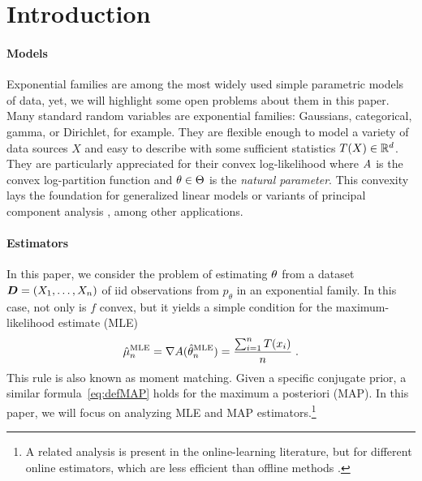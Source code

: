\section{Introduction}
\label{sec:motivation}

\paragraph{Models}
Exponential families are among the most widely used simple parametric models of data, yet, we will highlight some open problems about them in this paper.
Many standard random variables are exponential families: Gaussians, categorical, gamma, or Dirichlet, for example.
They are flexible enough to model a variety of data sources $X$ and easy to describe with some sufficient statistics $T(X) \in \mathbb{R}^d$.
They are particularly appreciated for their convex log-likelihood
where $A$ is the convex log-partition function and \mbox{$\theta\in\Theta$} is the \textit{natural parameter}.
This convexity lays the foundation for generalized linear models \citep{mccullagh1989generalized} or variants of principal component analysis \citep{collins2001generalization}, among other applications.

\paragraph{Estimators}
In this paper, we consider the problem of estimating $\theta$ from a dataset ${\bm{D}} = (X_1, \dots, X_n)$ of iid observations from $p_\theta$ in an exponential family.
In this case, not only is $f$ convex, but it yields a simple condition for the maximum-likelihood estimate (MLE)
\begin{align}
 \hat \mu_n^\text{MLE} = \nabla  A(\hat {\theta}_n^\text{MLE}) = \frac{\sum_{i=1}^n T(x_i)}{n} \; .
	\label{eq:defMLE}
\end{align}
This rule is also known as moment matching.
Given a specific conjugate prior, a similar formula~\eqref{eq:defMAP} holds for the maximum a posteriori (MAP). In this paper, we will focus on analyzing MLE and MAP estimators.\footnote{A related analysis is present in the online-learning literature, but for different online estimators, which are less efficient than offline methods \citep{azoury2001relative,dasgupta2007online}.}

